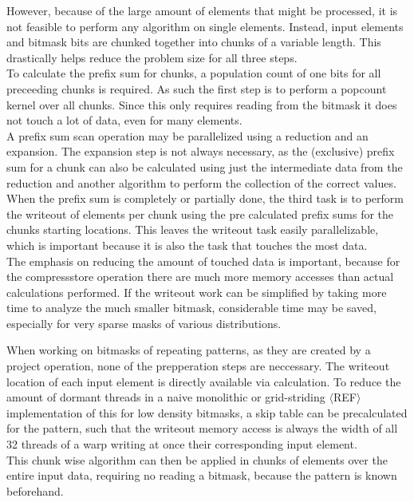 \documentclass{tudscrreprt}
\newcommand{\markr}[1]{\textcolor{review}{$\langle$#1$\rangle$}}
\begin{document}
		However, because of the large amount of elements that might be processed, it is not feasible to perform any algorithm on single elements. Instead, input elements and bitmask bits are chunked together into chunks of a variable length. This drastically helps reduce the problem size for all three steps. \\
		
		To calculate the prefix sum for chunks, a population count of one bits for all preceeding chunks is required. As such the first step is to perform a popcount kernel over all chunks. Since this only requires reading from the bitmask it does not touch a lot of data, even for many elements. \\
		
		A prefix sum scan operation may be parallelized using a reduction and an expansion. The expansion step is not always necessary, as the (exclusive) prefix sum for a chunk can also be calculated using just the intermediate data from the reduction and another algorithm to perform the collection of the correct values. \\
		
		When the prefix sum is completely or partially done, the third task is to perform the writeout of elements per chunk using the pre calculated prefix sums for the chunks starting locations. This leaves the writeout task easily parallelizable, which is important because it is also the task that touches the most data. \\
		
		The emphasis on reducing the amount of touched data is important, because for the compressstore operation there are much more memory accesses than actual calculations performed. If the writeout work can be simplified by taking more time to analyze the much smaller bitmask, considerable time may be saved, especially for very sparse masks of various distributions.
	
		When working on bitmasks of repeating patterns, as they are created by a project operation, none of the prepperation steps are neccessary. The writeout location of each input element is directly available via calculation. To reduce the amount of dormant threads in a naive monolithic or grid-striding \markr{REF} implementation of this for low density bitmasks, a skip table can be precalculated for the pattern, such that the writeout memory access is always the width of all 32 threads of a warp writing at once their corresponding input element. \\
		This chunk wise algorithm can then be applied in chunks of elements over the entire input data, requiring no reading a bitmask, because the pattern is known beforehand. \\
	
\end{document}
